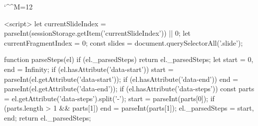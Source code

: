 \def\begincodeblock{%
    \par\vskip 15pt
    \setbox0=\vbox\bgroup
        \code 
        \parindent=0pt
        \leftskip=40pt  %
        \rightskip=40pt %
        \vskip 15pt     %
        \def\{{\char`\{}
        \def\}{\char`\}}
        \def\\{\char`\\}
        \def\_{\char`\_}
        \def\#{\char`\#}
        \def\%{\char`\%}
        \def\&{\char`\&}
        \def\^{\char`\^}
        \def\~{\char`\~}
        \def\${\char`\$}
}

\def\endcodeblock{%
        \vskip 15pt     %
    \egroup
    
    \noindent
    \hbox to \hsize{%
        {\kanagawasumiink \rlap{\vrule width \hsize height \ht0 depth \dp0}\popcolor}%
        \box0
        \hfil
    }%
    \par\vskip 15pt
}

\def\embedimage#1#2#3{%
    \loadasset{#1}%
    \drawasset \the\lastasset \space width #2 height #3%
}

\def\embedvideo#1#2#3{%
    \embedimage{#1}{#2}{#3}%
}

\long{}
\long{}
\long{}

\def\injectjs{%
    \begingroup
    \def\do##1{\catcode`##1=12 }\dospecials
    \catcode`\^^M=12
    \readjs
}
\def\injectcss{%
    \begingroup
    \def\do##1{\catcode`##1=12 }\dospecials
    \catcode`\^^M=12
    \readcss
}
\def\injecthtml{%
    \begingroup
    \def\do##1{\catcode`##1=12 }\dospecials
    \catcode`\^^M=12
    \readhtml
}

\injectjs
<script>
    let currentSlideIndex = parseInt(sessionStorage.getItem('currentSlideIndex')) || 0;
    let currentFragmentIndex = 0;
    const slides = document.querySelectorAll('.slide');

    function parseSteps(el) {
        if (el._parsedSteps) return el._parsedSteps;
        let start = 0, end = Infinity;
        if (el.hasAttribute('data-start')) {
            start = parseInt(el.getAttribute('data-start'));
        }
        if (el.hasAttribute('data-end')) {
            end = parseInt(el.getAttribute('data-end'));
        }
        if (el.hasAttribute('data-steps')) {
            const parts = el.getAttribute('data-steps').split('-');
            start = parseInt(parts[0]);
            if (parts.length > 1 && parts[1]) end = parseInt(parts[1]);
        }
        el._parsedSteps = {start, end};
        return el._parsedSteps;
    }

